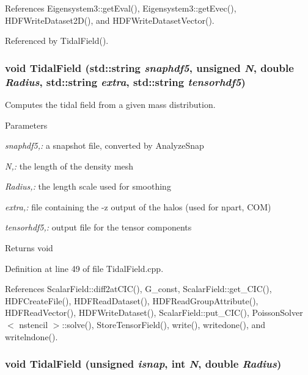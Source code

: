 References Eigensystem3::getEval(), Eigensystem3::getEvec(), HDFWriteDataset2D(), and HDFWriteDatasetVector().



Referenced by TidalField().

\subsubsection[{TidalField}]{\setlength{\rightskip}{0pt plus 5cm}void TidalField (std::string {\em snaphdf5}, \/  unsigned {\em N}, \/  double {\em Radius}, \/  std::string {\em extra}, \/  std::string {\em tensorhdf5})}\label{TidalField_8cpp_abb7805a812bc26fb645ef7cc1790a8d0}


Computes the tidal field from a given mass distribution. 


\begin{DoxyParams}{Parameters}
\item[{\em snaphdf5,:}]a snapshot file, converted by AnalyzeSnap \item[{\em N,:}]the length of the density mesh \item[{\em Radius,:}]the length scale used for smoothing \item[{\em extra,:}]file containing the -\/z output of the halos (used for npart, COM) \item[{\em tensorhdf5,:}]output file for the tensor components \end{DoxyParams}
\begin{DoxyReturn}{Returns}
void 
\end{DoxyReturn}


Definition at line 49 of file TidalField.cpp.



References ScalarField::diff2atCIC(), G\_\-const, ScalarField::get\_\-CIC(), HDFCreateFile(), HDFReadDataset(), HDFReadGroupAttribute(), HDFReadVector(), HDFWriteDataset(), ScalarField::put\_\-CIC(), PoissonSolver$<$ nstencil $>$::solve(), StoreTensorField(), write(), writedone(), and writelndone().

\subsubsection[{TidalField}]{\setlength{\rightskip}{0pt plus 5cm}void TidalField (unsigned {\em isnap}, \/  int {\em N}, \/  double {\em Radius})}\label{TidalField_8cpp_ad67677b74fe6123a6f5403a9610aba03}


